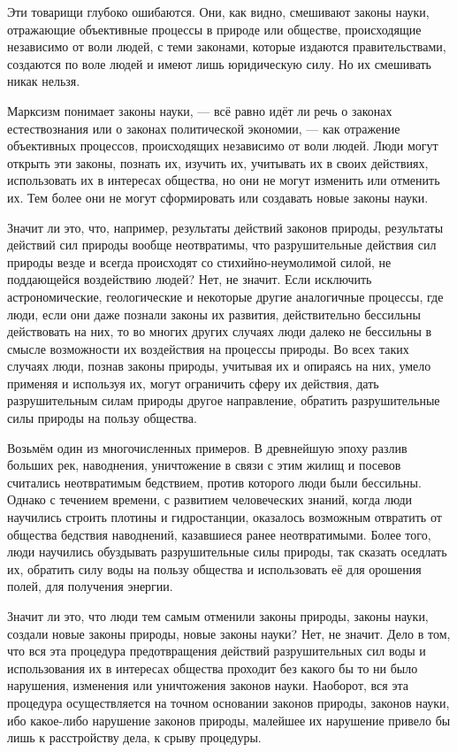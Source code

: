 \documentclass[12pt, a4paper, openany]{book}
\begin{document}
Эти товарищи глубоко ошибаются. Они, как видно, смешивают законы науки, отражающие объективные процессы в природе или обществе, происходящие независимо от воли людей, с теми законами, которые издаются правительствами, создаются по воле людей и имеют лишь юридическую силу. Но их смешивать никак нельзя.

Марксизм понимает законы науки, — всё равно идёт ли речь о законах естествознания или о законах политической экономии, — как отражение объективных процессов, происходящих независимо от воли людей. Люди могут открыть эти законы, познать их, изучить их, учитывать их в своих действиях, использовать их в интересах общества, но они не могут изменить или отменить их. Тем более они не могут сформировать или создавать новые законы науки.

Значит ли это, что, например, результаты действий законов природы, результаты действий сил природы вообще неотвратимы, что разрушительные действия сил природы везде и всегда происходят со стихийно-неумолимой силой, не поддающейся воздействию людей? Нет, не значит. Если исключить астрономические, геологические и некоторые другие аналогичные процессы, где люди, если они даже познали законы их развития, действительно бессильны действовать на них, то во многих других случаях люди далеко не бессильны в смысле возможности их воздействия на процессы природы. Во всех таких случаях люди, познав законы природы, учитывая их и опираясь на них, умело применяя и используя их, могут ограничить сферу их действия, дать разрушительным силам природы другое направление, обратить разрушительные силы природы на пользу общества.

Возьмём один из многочисленных примеров. В древнейшую эпоху разлив больших рек, наводнения, уничтожение в связи с этим жилищ и посевов считались неотвратимым бедствием, против которого люди были бессильны. Однако с течением времени, с развитием человеческих знаний, когда люди научились строить плотины и гидростанции, оказалось возможным отвратить от общества бедствия наводнений, казавшиеся ранее неотвратимыми. Более того, люди научились обуздывать разрушительные силы природы, так сказать оседлать их, обратить силу воды на пользу общества и использовать её для орошения полей, для получения энергии.

Значит ли это, что люди тем самым отменили законы природы, законы науки, создали новые законы природы, новые законы науки? Нет, не значит. Дело в том, что вся эта процедура предотвращения действий разрушительных сил воды и использования их в интересах общества проходит без какого бы то ни было нарушения, изменения или уничтожения законов науки. Наоборот, вся эта процедура осуществляется на точном основании законов природы, законов науки, ибо какое-либо нарушение законов природы, малейшее их нарушение привело бы лишь к расстройству дела, к срыву процедуры.
\end{document}
